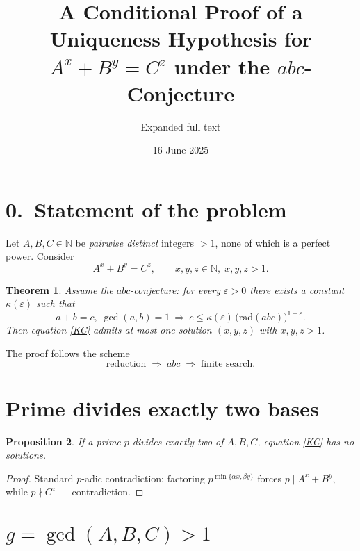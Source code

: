 \documentclass{article}
\newcommand{\N}{\mathbb N}
\newcommand{\rad}{\mathrm{rad}}
\newtheorem{theorem}{Theorem}
\newtheorem{proposition}[theorem]{Proposition}
\begin{document}
\title{A Conditional Proof of a Uniqueness Hypothesis for $A^x+B^y=C^z$ under the $abc$-Conjecture}
\author{Expanded full text}
\date{16 June 2025}
\maketitle

\section*{0.\ Statement of the problem}
Let $A,B,C\in\N$ be \emph{pairwise distinct} integers $>1$, none of which
is a perfect power. Consider
\begin{equation}\tag{KC}\label{KC}
A^{x}+B^{y}=C^{z},\qquad x,y,z\in\N,\;x,y,z>1.
\end{equation}

\begin{theorem}\label{thm:main}
Assume the $abc$-conjecture: for every $\varepsilon>0$ there exists a
constant $\kappa(\varepsilon)$ such that
\[
a+b=c,\;\gcd(a,b)=1
\ \Longrightarrow\
c\le\kappa(\varepsilon)\,\bigl(\rad(abc)\bigr)^{1+\varepsilon}.
\]
Then equation \textup{\eqref{KC}} admits \emph{at most one} solution
$(x,y,z)$ with $x,y,z>1$.
\end{theorem}

The proof follows the scheme
\[
    \text{reduction}\;\Longrightarrow\;abc\;\Longrightarrow\;\text{finite search}.
\]

\section{Prime divides exactly two bases}\label{sec:two}

\begin{proposition}\label{prop:two}
If a prime $p$ divides \emph{exactly two} of $A,B,C$, equation
\textup{\eqref{KC}} has no solutions.
\end{proposition}
\begin{proof}Standard $p$-adic contradiction: factoring $p^{\min\{\alpha
x,\beta y\}}$ forces $p\mid A^{x}+B^{y}$, while $p\nmid C^{z}$ --- contradiction.\end{proof}

\section{\texorpdfstring{$g=\gcd(A,B,C)>1$}{g=gcd(A,B,C)>1}}\label{sec:gcd}
\end{document}
